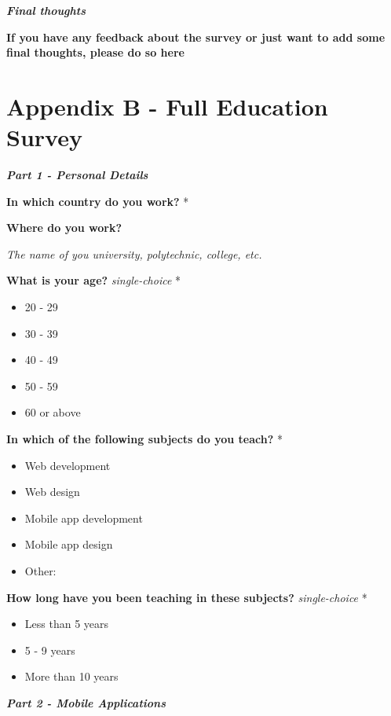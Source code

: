 \documentclass[a4paper,12pt]{article}
\begin{document}
\quad

\textbf{\textit{Final thoughts}}

\textbf{If you have any feedback about the survey or just want to add some final thoughts, please do so here}

\newpage
\section{Appendix B - Full Education Survey}
\label{Appendix_eduSurvey}

\textbf{\textit{Part 1 - Personal Details}}

\textbf{In which country do you work?} *

\quad

\textbf{Where do you work?}

\textit{The name of you university, polytechnic, college, etc.}

\quad

\textbf{What is your age?}  \textit{single-choice} *
\begin{itemize}
    \item 20 - 29
    \item 30 - 39
    \item 40 - 49
    \item 50 - 59
    \item 60 or above
\end{itemize}


\textbf{In which of the following subjects do you teach?} *
\begin{itemize}
    \item Web development
    \item Web design
    \item Mobile app development
    \item Mobile app design
    \item Other:
\end{itemize}

\textbf{How long have you been teaching in these subjects?} \textit{single-choice} *
\begin{itemize}
    \item Less than 5 years
    \item 5 - 9 years
    \item More than 10 years
\end{itemize}

\quad

\quad

\textbf{\textit{Part 2 - Mobile Applications}}
\end{document}
